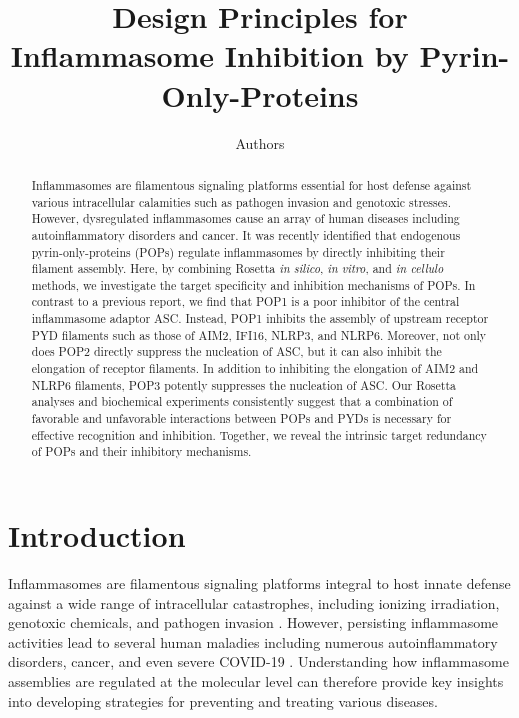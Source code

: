 \documentclass[11pt]{article}
\title{Design Principles for Inflammasome Inhibition by Pyrin-Only-Proteins}
\author[1]{Authors}
\affil[1]{Department of Structural Biology, University of Pittsburgh, Pittsburgh, PA, USA}
\date{}
\begin{document}
\maketitle

\begin{abstract}
Inflammasomes are filamentous signaling platforms essential for host defense against various intracellular calamities such as pathogen invasion and genotoxic stresses. However, dysregulated inflammasomes cause an array of human diseases including autoinflammatory disorders and cancer. It was recently identified that endogenous pyrin-only-proteins (POPs) regulate inflammasomes by directly inhibiting their filament assembly. Here, by combining Rosetta \textit{in silico}, \textit{in vitro}, and \textit{in cellulo} methods, we investigate the target specificity and inhibition mechanisms of POPs. In contrast to a previous report, we find that POP1 is a poor inhibitor of the central inflammasome adaptor ASC. Instead, POP1 inhibits the assembly of upstream receptor PYD filaments such as those of AIM2, IFI16, NLRP3, and NLRP6. Moreover, not only does POP2 directly suppress the nucleation of ASC, but it can also inhibit the elongation of receptor filaments. In addition to inhibiting the elongation of AIM2 and NLRP6 filaments, POP3 potently suppresses the nucleation of ASC. Our Rosetta analyses and biochemical experiments consistently suggest that a combination of favorable and unfavorable interactions between POPs and PYDs is necessary for effective recognition and inhibition. Together, we reveal the intrinsic target redundancy of POPs and their inhibitory mechanisms.
\end{abstract}

\section{Introduction}

Inflammasomes are filamentous signaling platforms integral to host innate defense against a wide range of intracellular catastrophes, including ionizing irradiation, genotoxic chemicals, and pathogen invasion \citep{broz2016,kagan2014,medzhitov2018}. However, persisting inflammasome activities lead to several human maladies including numerous autoinflammatory disorders, cancer, and even severe COVID-19 \citep{karki2017,tartey2020}. Understanding how inflammasome assemblies are regulated at the molecular level can therefore provide key insights into developing strategies for preventing and treating various diseases.
\end{document}
